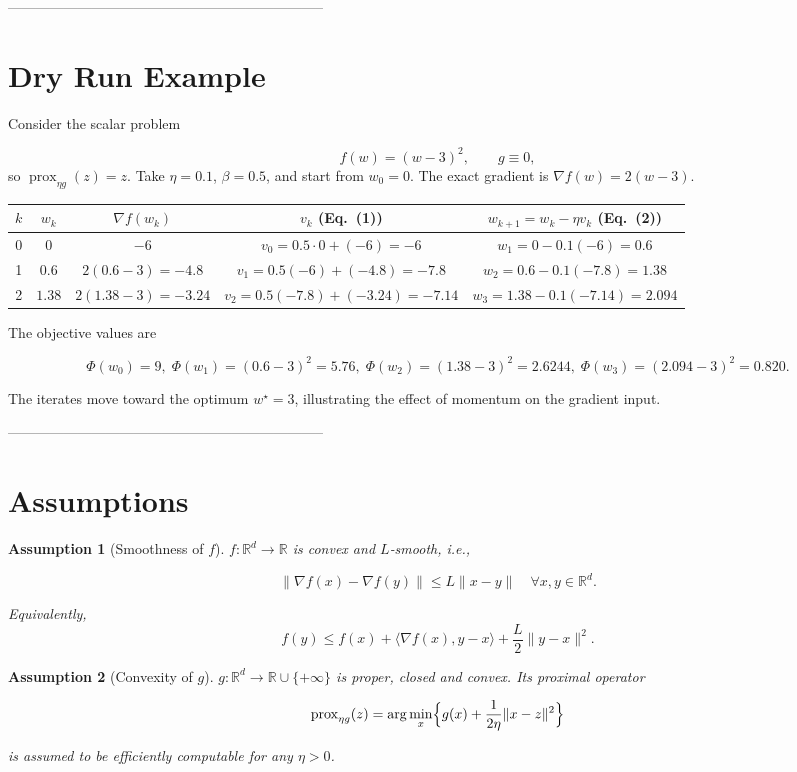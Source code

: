 \documentclass{article}
\newtheorem{assumption}{Assumption}
\newcommand{\prox}{\operatorname{prox}}
\newcommand{\R}{\mathbb{R}}
\begin{document}
--------------------------------------------------------------------

\section*{Dry Run Example}
Consider the scalar problem  

\[
f(w)= (w-3)^{2},\qquad g\equiv0,
\]
so $\prox_{\eta g}(z)=z$.  
Take $\eta=0.1$, $\beta=0.5$, and start from $w_{0}=0$.  
The exact gradient is $\nabla f(w)=2(w-3)$.

\begin{center}
\begin{tabular}{c|c|c|c|c}
$k$ & $w_{k}$ & $\nabla f(w_{k})$ & $v_{k}$ (Eq.~(1)) & $w_{k+1}=w_{k}-\eta v_{k}$ (Eq.~(2)) \\ \hline
0 & $0$ & $-6$ & $v_{0}=0.5\cdot0+(-6)=-6$ & $w_{1}=0-0.1(-6)=0.6$ \\[4pt]
1 & $0.6$ & $2(0.6-3)=-4.8$ & $v_{1}=0.5(-6)+(-4.8)=-7.8$ & $w_{2}=0.6-0.1(-7.8)=1.38$ \\[4pt]
2 & $1.38$ & $2(1.38-3)=-3.24$ & $v_{2}=0.5(-7.8)+(-3.24)=-7.14$ & $w_{3}=1.38-0.1(-7.14)=2.094$ 
\end{tabular}
\end{center}

The objective values are  

\[
\Phi(w_{0})=9,\;\Phi(w_{1})=(0.6-3)^{2}=5.76,\;
\Phi(w_{2})=(1.38-3)^{2}=2.6244,\;
\Phi(w_{3})=(2.094-3)^{2}=0.820.
\]

The iterates move toward the optimum $w^{\star}=3$, illustrating the effect of momentum on the gradient input.

--------------------------------------------------------------------

\section*{Assumptions}
\begin{assumption}[Smoothness of $f$]\label{ass:smooth}
$f:\R^{d}\to\R$ is convex and $L$‑smooth, i.e.,  

\[
\|\nabla f(x)-\nabla f(y)\|\le L\|x-y\|\quad\forall x,y\in\R^{d}.
\tag{A1}
\]

Equivalently,
\[
f(y)\le f(x)+\langle\nabla f(x),y-x\rangle+\frac{L}{2}\|y-x\|^{2}.
\tag{A1'}
\]
\end{assumption}

\begin{assumption}[Convexity of $g$]\label{ass:convexg}
$g:\R^{d}\to\R\cup\{+\infty\}$ is proper, closed and convex. Its proximal operator  

\[
\prox_{\eta g}(z)=\arg\min_{x}\Bigl\{ g(x)+\frac{1}{2\eta}\|x-z\|^{2}\Bigr\}
\]

is assumed to be efficiently computable for any $\eta>0$.
\end{assumption}
\end{document}
